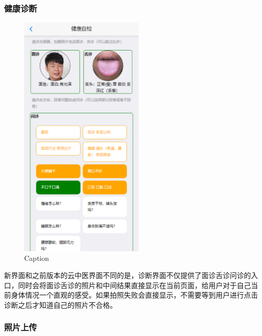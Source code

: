 \subsubsection{健康诊断}

\begin{figure}[ht]
    \centering
    \includegraphics[height=12cm]{images/diag.png}
    \caption{Caption}
    \label{fig:diag}
\end{figure}
新界面和之前版本的云中医界面不同的是，诊断界面不仅提供了面诊舌诊问诊的入口，同时会将面诊舌诊的照片和中间结果直接显示在当前页面，给用户对于自己当前身体情况一个直观的感受。如果拍照失败会直接显示，不需要等到用户进行点击诊断之后才知道自己的照片不合格。
	
\subsubsection{照片上传}

